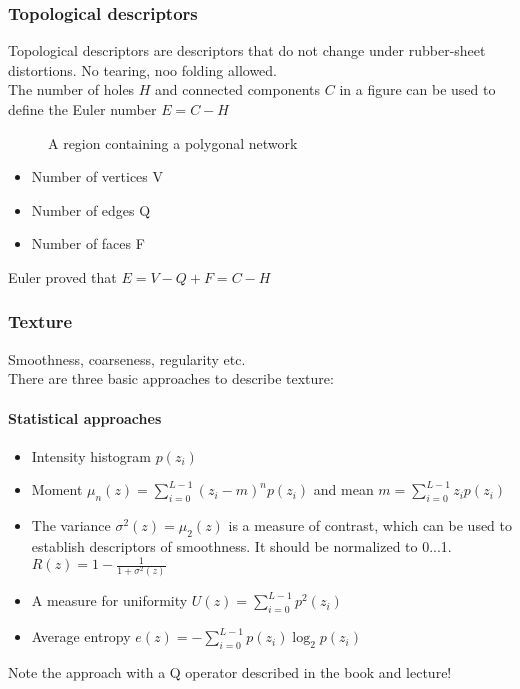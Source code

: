 \subsubsection{Topological descriptors}
Topological descriptors are descriptors that do not change under rubber-sheet distortions. No tearing, noo folding allowed.\\
The number of holes $H$ and connected components $C$ in a figure can be used to define the Euler number $E=C-H$\\

\begin{figure}[h]
	\centering
	\caption{A region containing a polygonal network}
\end{figure}

\begin{itemize}
\item Number of vertices V
\item Number of edges Q
\item Number of faces F
\end{itemize}
Euler proved that $E=V-Q+F=C-H$
\subsubsection{Texture}
Smoothness, coarseness, regularity etc.\\
There are three basic approaches to describe texture:\\
\paragraph{Statistical approaches}
\begin{itemize}
\item Intensity histogram $p(z_i)$
\item Moment $\mu_n(z)=\sum\limits_{i=0}^{L-1}(z_i-m)^np(z_i)$ and mean $m=\sum\limits_{i=0}^{L-1}z_ip(z_i)$
\item The variance $\sigma ^2(z) =\mu_2 (z)$ is a measure of contrast, which can be used to establish descriptors of smoothness. It should be normalized to 0...1. $R(z)=1-\frac{1}{1+\sigma ^2(z)}$
\item A measure for uniformity $U(z)=\sum\limits_{i=0}^{L-1}p^2(z_i)$
\item Average entropy $e(z)=-\sum\limits_{i=0}^{L-1}p(z_i)\log_2p(z_i)$
\end{itemize}
Note the approach with a Q operator described in the book and lecture!\\

